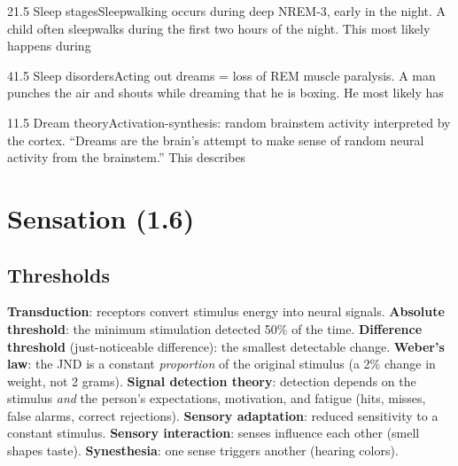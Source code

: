 \documentclass[11pt]{article}
\begin{document}
\begin{q}{2}{1.5 Sleep stages}{Sleepwalking occurs during deep NREM-3, early in the night.}
A child often sleepwalks during the first two hours of the night. This most likely happens during
\end{q}

\begin{q}{4}{1.5 Sleep disorders}{Acting out dreams = loss of REM muscle paralysis.}
A man punches the air and shouts while dreaming that he is boxing. He most likely has
\end{q}

\begin{q}{1}{1.5 Dream theory}{Activation-synthesis: random brainstem activity interpreted by the cortex.}
``Dreams are the brain's attempt to make sense of random neural activity from the brainstem.'' This describes
\end{q}

\section{Sensation (1.6)}

\subsection{Thresholds}
\textbf{Transduction}: receptors convert stimulus energy into neural signals. \textbf{Absolute threshold}: the minimum stimulation detected 50\% of the time. \textbf{Difference threshold} (just-noticeable difference): the smallest detectable change. \textbf{Weber's law}: the JND is a constant \emph{proportion} of the original stimulus (a 2\% change in weight, not 2 grams).
\textbf{Signal detection theory}: detection depends on the stimulus \emph{and} the person's expectations, motivation, and fatigue (hits, misses, false alarms, correct rejections). \textbf{Sensory adaptation}: reduced sensitivity to a constant stimulus. \textbf{Sensory interaction}: senses influence each other (smell shapes taste). \textbf{Synesthesia}: one sense triggers another (hearing colors).
\end{document}
